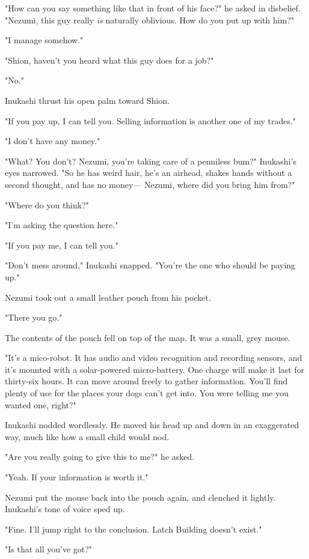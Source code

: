 "How can you say something like that in front of his face?" he asked in
disbelief. "Nezumi, this guy really \emph{is} naturally oblivious. How do you
put up with him?"

"I manage somehow."

"Shion, haven't you heard what this guy does for a job?"

"No."

Inukashi thrust his open palm toward Shion.

"If you pay up, I can tell you. Selling information is another one of my
trades."

"I don't have any money."

"What? You don't? Nezumi, you're taking care of a penniless bum?"
Inukashi's eyes narrowed. "So he has weird hair, he's an airhead, shakes
hands without a second thought, and has no money--- Nezumi, where did you
bring him from?"

"Where do you think?"

"I'm asking the question here."

"If you pay me, I can tell you."

"Don't mess around," Inukashi snapped. "You're the one who should be
paying up."

Nezumi took out a small leather pouch from his pocket.

"There you go."

The contents of the pouch fell on top of the map. It was a small, grey
mouse.

"It's a mico-robot. It has audio and video recognition and recording
sensors, and it's mounted with a solar-powered micro-battery. One charge
will make it last for thirty-six hours. It can move around freely to
gather information. You'll find plenty of use for the places your dogs
can't get into. You were telling me you wanted one, right?"

Inukashi nodded wordlessly. He moved his head up and down in an
exaggerated way, much like how a small child would nod.

"Are you really going to give this to me?" he asked.

"Yeah. If your information is worth it."

Nezumi put the mouse back into the pouch again, and clenched it lightly.
Inukashi's tone of voice sped up.

"Fine. I'll jump right to the conclusion. Latch Building doesn't exist."

"Is that all you've got?"

